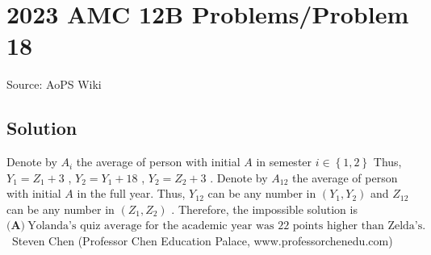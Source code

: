 \documentclass[12pt]{article}
\begin{document}
\section*{{2023 AMC 12B Problems/Problem 18}}
Source: AoPS Wiki

\subsection*{Solution}
Denote by $A_i$ the average of person with initial $A$ in semester $i \in \left\{1, 2 \right\}$ Thus, $Y_1 = Z_1 + 3$ , $Y_2 = Y_1 + 18$ , $Y_2 = Z_2 + 3$ . Denote by $A_{12}$ the average of person with initial $A$ in the full year.
Thus, $Y_{12}$ can be any number in $\left( Y_1 , Y_2 \right)$ and $Z_{12}$ can be any number in $\left( Z_1 , Z_2 \right)$ . Therefore, the impossible solution is $\boxed{\textbf{(A)}~\text{Yolanda's quiz average for the academic year was 22 points higher than Zelda's.}}$ ~Steven Chen (Professor Chen Education Palace, www.professorchenedu.com)
\end{document}
